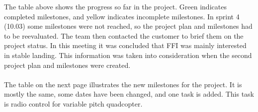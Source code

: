 \vspace{3cm}
\noindent
The table above shows the progress so far in the project. Green indicates completed milestones, and yellow indicates incomplete milestones. In sprint 4 (10.03) some milestones were not reached, so the project plan and milestones had to be reevaluated. The team then contacted the customer to brief them on the project status. In this meeting it was concluded that FFI was mainly interested in stable landing. This information was taken into consideration when the second project plan and milestones were created.
\\\\
The table on the next page illustrates the new milestones for the project. It is mostly the same, some dates have been changed, and one task is added. This task is radio control for variable pitch quadcopter.


